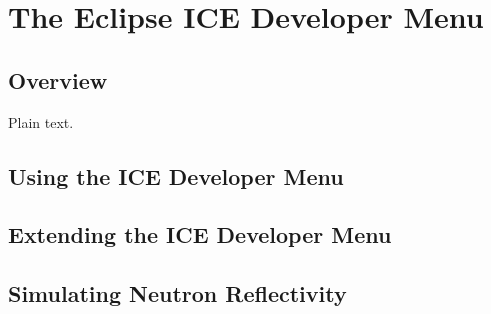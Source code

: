 \documentclass{article}
\begin{document}
\section{The Eclipse ICE Developer Menu}

\subsection{Overview}

Plain text.

\subsection{Using the ICE Developer Menu}
\subsection{Extending the ICE Developer Menu}
\subsection{Simulating Neutron Reflectivity}
\end{document}
